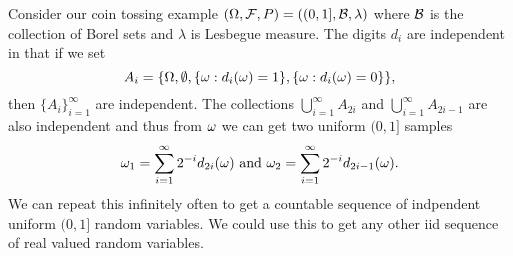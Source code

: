 \begin{ex}
    Consider our coin tossing example $({{\Omega}}, {\mathcal{F}}, P) = ((0,1], {\mathcal{B}}, \lambda)$ where ${\mathcal{B}}$ is the collection of Borel sets and $\lambda$ is Lesbegue measure. The digits $d_i$ are independent in that if we set
    \[A_i = \{{{\Omega}}, \emptyset, \{{\omega} : d_i({\omega})=1\}, \{{\omega} : d_i({\omega})=0\}\}, \]
    then $\{A_i\}_{i=1}^\infty$ are independent. The collections $\bigcup_{i=1}^\infty A_{2i}$ and $\bigcup_{i=1}^\infty A_{2i-1}$ are also independent and thus from ${\omega}$ we can get two uniform $(0,1]$ samples 
    \[{\omega}_1 = \sum_{i=1}^\infty 2^{-i}d_{2i}({\omega}) \text{ and } {\omega}_2 = \sum_{i=1}^\infty 2^{-i}d_{2i-1}({\omega}). \]
    We can repeat this infinitely often to get a countable sequence of indpendent uniform $(0,1]$ random variables. We could use this to get any other iid sequence of real valued random variables.
\end{ex}
